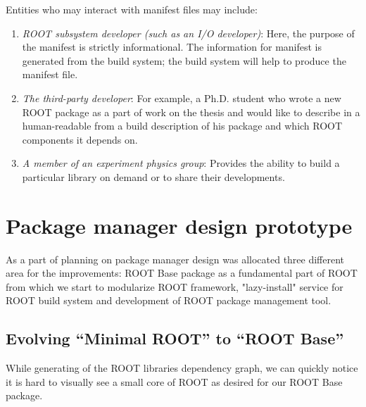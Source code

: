 \documentclass{webofc}
\begin{document}
Entities who may interact with manifest files may include:
\begin{enumerate}
\item \textit{ROOT subsystem developer (such as an I/O developer)}: Here, the purpose of the manifest is strictly informational. The information for manifest is generated from the build system; the build system will help to produce the manifest file.
\item \textit{The third-party developer}:  For example, a Ph.D. student who wrote a new ROOT package as a part of work on the thesis and would like to describe in a human-readable from a build description of his package and which ROOT components it depends on.
\item \textit{A member of an experiment physics group}: Provides the ability to build a particular library on demand or to share their developments.
\end{enumerate}



\section{Package manager design prototype}

As a part of planning on package manager design was allocated three different area for the improvements: ROOT Base package as a fundamental part of ROOT from which we start to modularize ROOT framework, "lazy-install" service for ROOT build system and development of ROOT package management tool.

\subsection{Evolving “Minimal ROOT” to “ROOT Base”}

While generating of the ROOT libraries dependency graph, we can quickly notice it is hard to visually see a small core of ROOT as desired for our ROOT Base package. %
\end{document}
